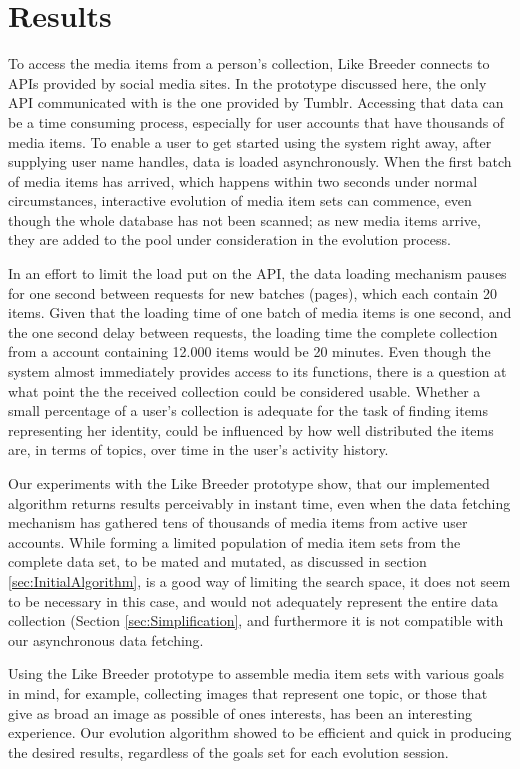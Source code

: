\documentclass[]{article}
\begin{document}
\section{Results}
\label{sec:Results}

To access the media items from a person's collection, Like Breeder connects to APIs provided by social media sites.  In the prototype discussed here, the only API communicated with is the one provided by Tumblr.  Accessing that data can be a time consuming process, especially for user accounts that have thousands of media items.  To enable a user to get started using the system right away, after supplying user name handles, data is loaded asynchronously.  When the first batch of media items has arrived, which happens within two seconds under normal circumstances, interactive evolution of media item sets can commence, even though the whole database has not been scanned; as new media items arrive, they are added to the pool under consideration in the evolution process.  

In an effort to limit the load put on the API, the data loading mechanism pauses for one second between requests for new batches (pages), which each contain 20 items.  Given that the loading time of one batch of media items is one second, and the one second delay between requests, the loading time the complete collection from a account containing 12.000 items would be 20 minutes.  Even though the system almost immediately provides access to its functions, there is a question at what point the the received collection could be considered usable.  Whether a small percentage of a user's collection is adequate for the task of finding items representing her identity, could be influenced by how well distributed the items are, in terms of topics, over time in the user's activity history.

Our experiments with the Like Breeder prototype show, that our implemented algorithm returns results perceivably in instant time, even when the data fetching mechanism has gathered tens of thousands of media items from active user accounts.  While forming a limited population of media item sets from the complete data set, to be mated and mutated, as discussed in section \ref{sec:InitialAlgorithm}, is a good way of limiting the search space, it does not seem to be necessary in this case, and would not adequately represent the entire data collection (Section \ref{sec:Simplification}, and furthermore it is not compatible with our asynchronous data fetching.

Using the Like Breeder prototype to assemble media item sets with various goals in mind, for example, collecting images that represent one topic, or those that give as broad an image as possible of ones interests, has been an interesting experience.  Our evolution algorithm showed to be efficient and quick in producing the desired results, regardless of the goals set for each evolution session.
\end{document}
